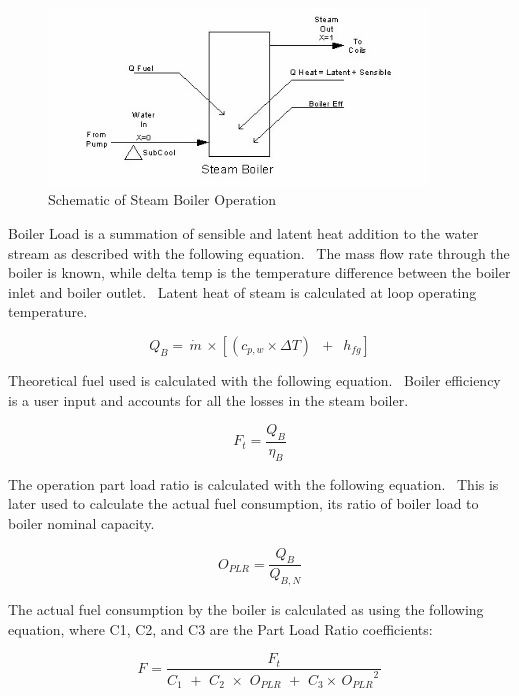 \begin{figure}[hbtp] %
\centering
\includegraphics[width=0.9\textwidth, height=0.9\textheight, keepaspectratio=true]{media/image2933.png}
\caption{Schematic of Steam Boiler Operation \protect \label{fig:schematic-of-steam-boiler-operation}}
\end{figure}

Boiler Load is a summation of sensible and latent heat addition to the water stream as described with the following equation.~ The mass flow rate through the boiler is known, while delta temp is the temperature difference between the boiler inlet and boiler outlet.~ Latent heat of steam is calculated at loop operating temperature.

\begin{equation}
{Q_B} = \,\dot m\, \times \left[ {({c_{p,w}} \times \Delta T)\,\,\, + \,\,\,{h_{fg}}} \right]
\end{equation}

Theoretical fuel used is calculated with the following equation.~ Boiler efficiency is a user input and accounts for all the losses in the steam boiler.

\begin{equation}
{F_t} = \frac{{{Q_B}}}{{{\eta_B}}}
\end{equation}

The operation part load ratio is calculated with the following equation.~ This is later used to calculate the actual fuel consumption, its ratio of boiler load to boiler nominal capacity.

\begin{equation}
{O_{PLR}} = \frac{{{Q_B}}}{{{Q_{B,N}}}}
\end{equation}

The actual fuel consumption by the boiler is calculated as using the following equation, where C1, C2, and C3 are the Part Load Ratio coefficients:

\begin{equation}
{F_{}} = \frac{{{F_t}}}{{{C_1}\,\, + \,\,{C_2}\,\, \times \,\,{O_{PLR}}\,\, + \,\,{C_3} \times \,{O_{PLR}}^2\,}}
\end{equation}

